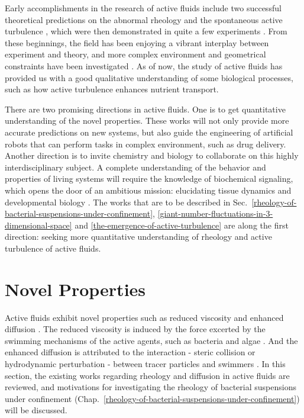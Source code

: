Early accomplishments in the research of active fluids include two successful theoretical predictions on the abnormal rheology and the spontaneous active turbulence \cite{Hatwalne2004, Simha2002}, which were then demonstrated in quite a few experiments
\cite{Dombrowski2004, Wensink2012, Rafai2010, Sokolov2009, Gachelin2013, Lopez2015}. From these beginnings, the field has been enjoying a vibrant interplay between experiment and theory, and more complex environment and geometrical constraints have been investigated \cite{Ramaswamy2019}. As of now, the study of active fluids has provided us with a good qualitative understanding of some biological processes, such as how active turbulence enhances nutrient transport.

There are two promising directions in active fluids. One is to get quantitative understanding of the novel properties.  These works will not only provide more accurate predictions on new systems, but also guide the engineering of artificial robots that can perform tasks in complex environment, such as drug delivery. Another direction is to invite chemistry and biology to collaborate on this highly interdisciplinary subject. A complete understanding of the behavior and properties of living systems will require the knowledge of biochemical signaling, which opens the door of an ambitious mission: elucidating tissue dynamics and developmental biology \cite{Marchetti2013, Curatolo2020}. The works that are to be described in Sec.~\ref{rheology-of-bacterial-suspensions-under-confinement},
\ref{giant-number-fluctuations-in-3-dimensional-space} and \ref{the-emergence-of-active-turbulence} are along the first direction: seeking more quantitative understanding of rheology and active turbulence of active fluids.



\section{Novel Properties}
\label{emergent-properties}
Active fluids exhibit novel properties such as reduced viscosity and enhanced diffusion  \cite{Ramaswamy2010}. The reduced viscosity is induced by the force excerted by the swimming mechanisms of the active agents, such as bacteria and algae \cite{Saintillan2018}. And the enhanced diffusion is attributed to the interaction - steric collision or hydrodynamic perturbation - between tracer particles and swimmers
\cite{Wu2000, Peng2016, Caspi2000, Morozov2014, Patteson2016, Leptos2009,
 Yang2016, Valeriani2011, Kurtuldu2011}.
In this section, the existing works regarding rheology and diffusion in active fluids are reviewed, and motivations for investigating the rheology of bacterial suspensions under confinement (Chap.~\ref{rheology-of-bacterial-suspensions-under-confinement}) will be discussed.


